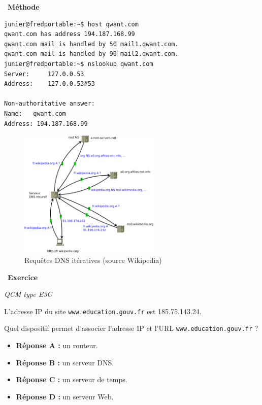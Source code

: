 \documentclass[
  11pt,
]{article}
\newcommand{\passthrough}[1]{#1}
\providecommand{\tightlist}{%
  \setlength{\itemsep}{0pt}\setlength{\parskip}{0pt}}
\newcounter{exo}
\newenvironment{exercice}[1]
{\par \medskip   \addtocounter{exo}{1} \noindent  
\begin{bclogo}[arrondi =0.1,   noborder = true, logo=\bccrayon, marge=4]{~\textbf{Exercice} \textbf{\theexo} {\itshape #1} }  \par}
{
\end{bclogo}
 \par \bigskip }
\newenvironment{methode}[1]
{\par \medskip    \noindent  
 \begin {bclogo}[arrondi =0.1,logo=\bcoutil, marge=4,noborder = true] {~\textbf{Méthode}   {\itshape #1} }  \par}
{
\end{bclogo}
 \par \bigskip }
\begin{document}
\begin{methode}{}
\begin{lstlisting}[language=bash]
junier@fredportable:~$ host qwant.com
qwant.com has address 194.187.168.99
qwant.com mail is handled by 50 mail1.qwant.com.
qwant.com mail is handled by 90 mail2.qwant.com.
junier@fredportable:~$ nslookup qwant.com
Server:     127.0.0.53
Address:    127.0.0.53#53

Non-authoritative answer:
Name:   qwant.com
Address: 194.187.168.99
\end{lstlisting}

\end{methode}

\begin{figure}
\centering
\includegraphics[width=0.6\textwidth,height=\textheight]{images/528px-DNS_iterations.svg.png}
\caption{Requêtes DNS itératives (source Wikipedia)}
\end{figure}

\begin{exercice}{}

\emph{QCM type E3C}

L'adresse IP du site \passthrough{\lstinline!www.education.gouv.fr!} est
185.75.143.24.

Quel dispositif permet d'associer l'adresse IP et l'URL
\passthrough{\lstinline!www.education.gouv.fr!} ?

\begin{itemize}
\tightlist
\item
  \textbf{Réponse A :} un routeur.
\item
  \textbf{Réponse B :} un serveur DNS.
\item
  \textbf{Réponse C :} un serveur de temps.
\item
  \textbf{Réponse D :} un serveur Web.
\end{itemize}

\end{exercice}
\end{document}

